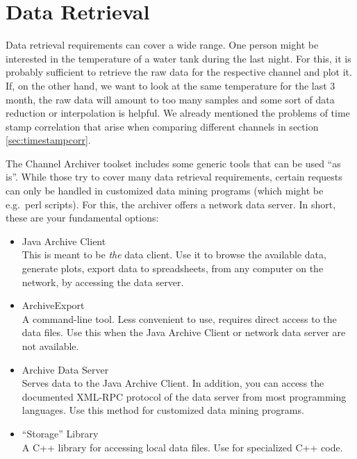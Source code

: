 \chapter{Data Retrieval}  \label{chap:retrieval}
Data retrieval requirements can cover a wide range.  One person might
be interested in the temperature of a water tank during the last
night. For this, it is probably sufficient to retrieve the raw data
for the respective channel and plot it.  If, on the other hand, we
want to look at the same temperature for the last 3 month, the raw
data will amount to too many samples and some sort of data reduction
or interpolation is helpful.  We already mentioned the problems of
time stamp correlation that arise when comparing different channels in
section \ref{sec:timestampcorr}.

The Channel Archiver toolset includes some generic tools that can be
used ``as is''. While those try to cover many data retrieval
requirements, certain requests can only be handled in customized data
mining programs (which might be e.g.\ perl scripts). For this, the
archiver offers a network data server. In short, these are your
fundamental options:

\begin{itemize}
\item Java Archive Client\\
      This is meant to be \emph{the} data client. Use it to browse the
      available data, generate plots, export data to spreadsheets,
      from any computer on the network, by accessing the data server.
\item ArchiveExport\\
      A command-line tool. Less convenient to use, requires direct
      access to the data files. Use this when the Java Archive Client
      or network data server are not available.
\item Archive Data Server\\
      Serves data to the Java Archive Client. In addition, you can
      access the documented XML-RPC protocol of the data server from
      most programming languages. Use this method for customized data
      mining programs.
\item ``Storage'' Library\\
      A C++ library for accessing local data files. Use for
      specialized C++ code.
\end{itemize}